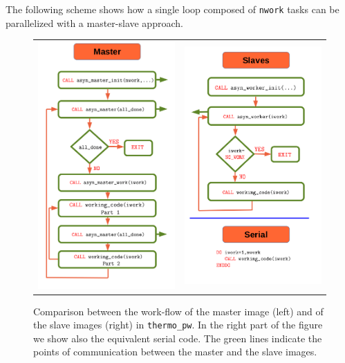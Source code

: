 \documentclass[12pt,a4paper]{article}
\begin{document}
The following scheme shows how a single loop composed of \texttt{nwork} tasks
can be parallelized with a master-slave approach.

\begin{figure}[ht]
  \begin{tabular}[t]{ll}
    \includegraphics[height=0.80\textwidth]{flowmaster.png}
    &\includegraphics[height=0.80\textwidth]{flowslave.png}\\
  \end{tabular}
 \caption{Comparison between the work-flow of the master image (left)
 and of the slave images (right) in \texttt{thermo\_pw}. In the right
part of the figure we show also the equivalent serial code. The green lines
indicate the points of communication between the master and the slave images.
}
\label{figflow}
\end{figure}
\end{document}
